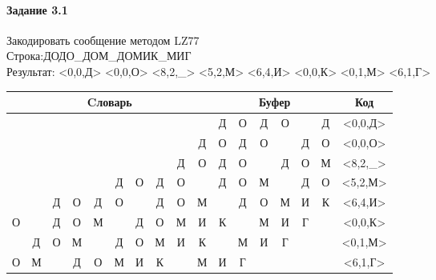 \documentclass[a4paper, 12pt]{article}
\begin{document}
\paragraph{Задание 3.1}

Закодировать сообщение методом LZ77\\
Строка:ДОДО\_ДОМ\_ДОМИК\_МИГ\\
Результат: <0,0,Д> <0,0,О> <8,2,\_> <5,2,М> <6,4,И> <0,0,К> <0,1,М> <6,1,Г>\\
\begin{table}[h!]
\centering
\begin{tabular}{|c|c|c|c|c|c|c|c|c|c|c|c|c|c|c|c|c|} 
\hline
\multicolumn{10}{|c|}{Cловарь} & \multicolumn{6}{c|}{Буфер} & Код  \\ \hline
  &   &   &   &   &   &   &   &   &   & \cellcolor[HTML]{8CE4F6} Д & О & Д & О &   & Д & <0,0,Д>
\\ \hline
  &   &   &   &   &   &   &   &   & Д & \cellcolor[HTML]{8CE4F6} О & Д & О &   & Д & О & <0,0,О>
\\ \hline
  &   &   &   &   &   &   &   & \cellcolor[HTML]{FFFF00} Д & \cellcolor[HTML]{FFFF00} О & \cellcolor[HTML]{FFFF00} Д & \cellcolor[HTML]{FFFF00} О & \cellcolor[HTML]{8CE4F6}   & Д & О & М & <8,2,\_>
\\ \hline
  &   &   &   &   & \cellcolor[HTML]{FFFF00} Д & \cellcolor[HTML]{FFFF00} О & Д & О &   & \cellcolor[HTML]{FFFF00} Д & \cellcolor[HTML]{FFFF00} О & \cellcolor[HTML]{8CE4F6} М &   & Д & О & <5,2,М>
\\ \hline
  &   & Д & О & Д & О & \cellcolor[HTML]{FFFF00}   & \cellcolor[HTML]{FFFF00} Д & \cellcolor[HTML]{FFFF00} О & \cellcolor[HTML]{FFFF00} М & \cellcolor[HTML]{FFFF00}   & \cellcolor[HTML]{FFFF00} Д & \cellcolor[HTML]{FFFF00} О & \cellcolor[HTML]{FFFF00} М & \cellcolor[HTML]{8CE4F6} И & К & <6,4,И>
\\ \hline
О &   & Д & О & М &   & Д & О & М & И & \cellcolor[HTML]{8CE4F6} К &   & М & И & Г &   & <0,0,К>
\\ \hline
\cellcolor[HTML]{FFFF00}   & Д & О & М &   & Д & О & М & И & К & \cellcolor[HTML]{FFFF00}   & \cellcolor[HTML]{8CE4F6} М & И & Г &   &   & <0,1,М>
\\ \hline
О & М &   & Д & О & М & \cellcolor[HTML]{FFFF00} И & К &   & М & \cellcolor[HTML]{FFFF00} И & \cellcolor[HTML]{8CE4F6} Г &   &   &   &   & <6,1,Г>
\\ \hline
\end{tabular}
\end{table}
\end{document}
